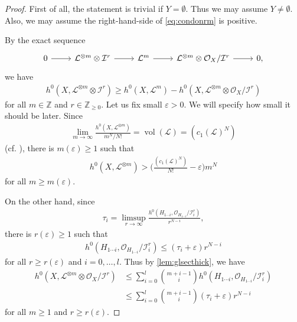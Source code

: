 \documentclass[12pt]{amsart}
\theoremstyle{plain}
\theoremstyle{definition}
\numberwithin{equation}{section}
\def\Z{{\mathbb Z}}
\def\O{{ \mathcal{O}}}
\def\I{{ \mathcal{I}}}
\def\L{{ \mathcal{L}}}
\DeclareMathOperator{\vol}{vol}
\newcommand{\e}{\varepsilon}
\begin{document}
\begin{proof}
First of all, the statement is trivial if $Y =  \emptyset$.
Thus we may assume $Y \neq  \emptyset$.
Also, we may assume the right-hand-side of \cref{eq:condonrm} is positive.

By the exact sequence
\begin{equation}
\begin{tikzcd}
0  \arrow[r] & \L^{ \otimes m} \otimes \I^{r}  \arrow[r] & \L^{m} \arrow[r] & \L^{ \otimes m} \otimes \O_{X}/\I^{r} \arrow[r] & 0,
\end{tikzcd}
\end{equation}
we have
\begin{align}
h^{0}(X,  \L^{ \otimes m} \otimes \I^{r} ) \geq h^{0}(X, \L^{m}) - h^{0}(X, \L^{ \otimes m} \otimes \O_{X}/\I^{r}) \label{eq:h0lowerbound}
\end{align}
for all $m \in \Z$ and $r \in \Z_{\geq 0}$.
Let us fix small $\e > 0$. We will specify how small it should be later.
Since
\begin{align}
\lim_{m \to \infty} \frac{h^{0}(X, \L^{ \otimes m})}{m^{N}/N!} = \vol( \L) = (c_{1}(\L)^{N})
\end{align}
(cf. \cite[Example 11.4.7]{Lazpos2}), 
there is $m(\e) \geq 1$ such that
\begin{align}
h^{0}(X, \L^{ \otimes m}) > \bigg( \frac{(c_{1}(\L)^{N})}{N!} - \e \bigg) m^{N} \label{eq:h0Lmlowerbound}
\end{align}
for all $m \geq m(\e)$.

On the other hand, since
\begin{align}
\tau_{i} = \limsup_{r \to \infty} \frac{h^{0}(H_{1\cdots i}, \O_{H_{1\cdots i}}/\I_{i}^{r})}{r^{N-i}},
\end{align}
there is $r(\e) \geq 1$ such that
\begin{align}
h^{0}(H_{1\cdots i}, \O_{H_{1\cdots i}}/\I_{i}^{r}) \leq (\tau_{i} + \e)r^{N-i}
\end{align}
for all $r \geq r(\e)$ and $i=0,\dots, l$.
Thus by \cref{lem:glsecthick}, we have
\begin{align}
h^{0}(X, \L^{ \otimes m} \otimes \O_{X}/\I^{r})
&\leq
\sum_{i=0}^{l} \binom{m+i-1}{i} h^{0}(H_{1\cdots i}, \O_{H_{1\cdots i}}/\I_{i}^{r})\\
&\leq
\sum_{i=0}^{l} \binom{m+i-1}{i}  (\tau_{i} + \e)r^{N-i} \label{eq:h0LmOIrupperbound}
\end{align}
for all $m \geq 1$ and $r \geq r(\e)$.


\end{proof}
\end{document}
